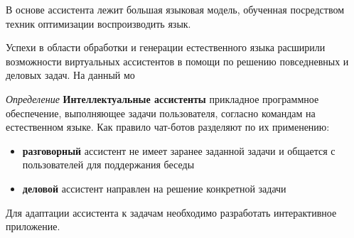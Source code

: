 В основе ассистента лежит большая языковая модель, обученная посредством техник оптимизации воспроизводить язык.

Успехи в области обработки и генерации естественного языка расширили
возможности виртуальных ассистентов в помощи по решению повседневных и деловых задач. На данный мо


\textit{Определение} \textbf{Интеллектуальные ассистенты} прикладное программное обеспечение, выполняющее задачи пользователя, согласно командам на естественном языке. 
Как правило чат-ботов разделяют по их применению:
\begin{itemize}
    \item \textbf{разговорный} ассистент не имеет заранее заданной задачи и общается с пользователей для поддержания беседы
    \item \textbf{деловой} ассистент направлен на решение конкретной задачи
\end{itemize}


Для адаптации ассистента к задачам необходимо разработать интерактивное приложение.




